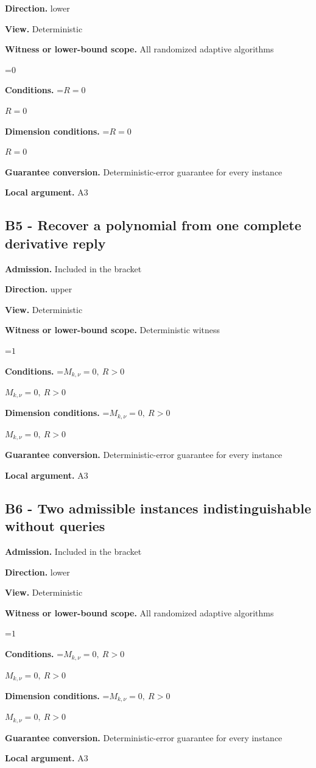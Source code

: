 \documentclass[10pt,a4paper]{article}
\newcommand{\AtlasMath}[1]{\par\begingroup\centering\setbox0=\hbox{$\displaystyle #1$}\ifdim\wd0>1.4\linewidth\typeout{ATLAS WIDE FORMULA: \the\wd0}\fi\ifdim\wd0>\linewidth\resizebox{\linewidth}{!}{\box0}\else\box0\fi\par\endgroup}
\newcommand{\AtlasInlineMath}[1]{\begingroup\setbox0=\hbox{$#1$}\ifdim\wd0>.4\linewidth\endgroup\AtlasMath{#1}\else\endgroup$#1$\fi}
\begin{document}
\textbf{Direction.} lower

\textbf{View.} Deterministic

\textbf{Witness or lower-bound scope.} All randomized adaptive algorithms

\AtlasMath{0}
\textbf{Conditions.} \AtlasInlineMath{R=0}

\textbf{Dimension conditions.} \AtlasInlineMath{R=0}

\textbf{Guarantee conversion.} Deterministic-error guarantee for every instance

\textbf{Local argument.} A3

\subsection{B5 - Recover a polynomial from one complete derivative reply}
\textbf{Admission.} Included in the bracket

\textbf{Direction.} upper

\textbf{View.} Deterministic

\textbf{Witness or lower-bound scope.} Deterministic witness

\AtlasMath{1}
\textbf{Conditions.} \AtlasInlineMath{M_{k,\nu}=0,\ R>0}

\textbf{Dimension conditions.} \AtlasInlineMath{M_{k,\nu}=0,\ R>0}

\textbf{Guarantee conversion.} Deterministic-error guarantee for every instance

\textbf{Local argument.} A3

\subsection{B6 - Two admissible instances indistinguishable without queries}
\textbf{Admission.} Included in the bracket

\textbf{Direction.} lower

\textbf{View.} Deterministic

\textbf{Witness or lower-bound scope.} All randomized adaptive algorithms

\AtlasMath{1}
\textbf{Conditions.} \AtlasInlineMath{M_{k,\nu}=0,\ R>0}

\textbf{Dimension conditions.} \AtlasInlineMath{M_{k,\nu}=0,\ R>0}

\textbf{Guarantee conversion.} Deterministic-error guarantee for every instance

\textbf{Local argument.} A3
\end{document}
